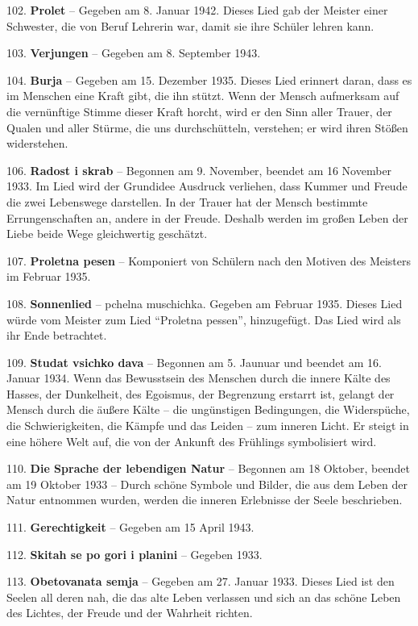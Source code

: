 \documentclass[11pt,a5paper,twoside]{article}
\begin{document}
102. \textbf{Prolet} -- Gegeben am 8. Januar 1942. Dieses Lied gab der Meister einer Schwester, die von Beruf Lehrerin war, damit sie ihre Schüler lehren kann.

103. \textbf{Verjungen} -- Gegeben am 8. September 1943.

104. \textbf{Burja} -- Gegeben am 15. Dezember 1935. Dieses Lied erinnert daran, dass es im Menschen eine Kraft gibt, die ihn stützt. Wenn der Mensch aufmerksam auf die vernünftige Stimme dieser Kraft horcht, wird er den Sinn aller Trauer, der Qualen und aller Stürme, die uns durchschütteln, verstehen; er wird ihren Stößen widerstehen. 

106. \textbf{Radost i skrab }-- Begonnen am 9. November, beendet am 16 November 1933. Im Lied wird der Grundidee Ausdruck verliehen, dass Kummer und Freude die zwei Lebenswege darstellen. In der Trauer hat der Mensch bestimmte Errungenschaften an, andere in der Freude. Deshalb werden im großen Leben der Liebe beide Wege gleichwertig geschätzt.

107. \textbf{Proletna pesen} -- Komponiert von Schülern nach den Motiven des Meisters im Februar 1935.

108. \textbf{Sonnenlied} -- pchelna muschichka. Gegeben am Februar 1935. Dieses Lied würde vom Meister zum Lied "`Proletna pessen"', hinzugefügt. Das Lied wird als ihr Ende betrachtet. 

109. \textbf{Studat vsichko dava} -- Begonnen am 5. Jaunuar und beendet am 16. Januar 1934. Wenn das Bewusstsein des Menschen durch die innere Kälte des Hasses, der Dunkelheit, des Egoismus, der Begrenzung erstarrt ist, gelangt der Mensch durch die äußere Kälte -- die ungünstigen Bedingungen, die Widerspüche, die Schwierigkeiten, die Kämpfe und das Leiden -- zum inneren Licht. Er steigt in eine höhere Welt auf, die von der Ankunft des Frühlings symbolisiert wird.

110. \textbf{Die Sprache der lebendigen Natur} -- Begonnen am 18 Oktober, beendet am 19 Oktober 1933 -- Durch schöne Symbole und Bilder, die aus dem Leben der Natur entnommen wurden, werden die inneren Erlebnisse der Seele beschrieben.

111. \textbf{Gerechtigkeit} -- Gegeben am 15 April 1943.

112. \textbf{Skitah se po gori i planini} -- Gegeben 1933.

113. \textbf{Obetovanata semja} -- Gegeben am 27. Januar 1933. Dieses Lied ist den Seelen all deren nah, die das alte Leben verlassen und sich an das schöne Leben des Lichtes, der Freude und der Wahrheit richten. 
\end{document}

